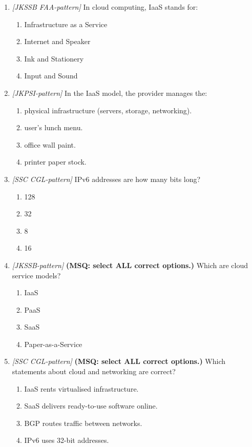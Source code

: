 \documentclass[11pt]{article}
\begin{document}
\begin{enumerate}[label=\textbf{Q\arabic*.}, leftmargin=*]
\item \textit{[JKSSB FAA-pattern]} In cloud computing, IaaS stands for:
  \begin{enumerate}[label=\Alph*.]
    \item Infrastructure as a Service
    \item Internet and Speaker
    \item Ink and Stationery
    \item Input and Sound
  \end{enumerate}
\item \textit{[JKPSI-pattern]} In the IaaS model, the provider manages the:
  \begin{enumerate}[label=\Alph*.]
    \item physical infrastructure (servers, storage, networking).
    \item user's lunch menu.
    \item office wall paint.
    \item printer paper stock.
  \end{enumerate}
\item \textit{[SSC CGL-pattern]} IPv6 addresses are how many bits long?
  \begin{enumerate}[label=\Alph*.]
    \item 128
    \item 32
    \item 8
    \item 16
  \end{enumerate}
\item \textit{[JKSSB-pattern]} \textbf{(MSQ: select ALL correct options.)} Which are cloud service models?
  \begin{enumerate}[label=\Alph*.]
    \item IaaS
    \item PaaS
    \item SaaS
    \item Paper-as-a-Service
  \end{enumerate}
\item \textit{[SSC CGL-pattern]} \textbf{(MSQ: select ALL correct options.)} Which statements about cloud and networking are correct?
  \begin{enumerate}[label=\Alph*.]
    \item IaaS rents virtualised infrastructure.
    \item SaaS delivers ready-to-use software online.
    \item BGP routes traffic between networks.
    \item IPv6 uses 32-bit addresses.
  \end{enumerate}
\end{enumerate}
\def\JKSSBLessonID{62}\def\JKSSBAnswers{0}
\end{document}
